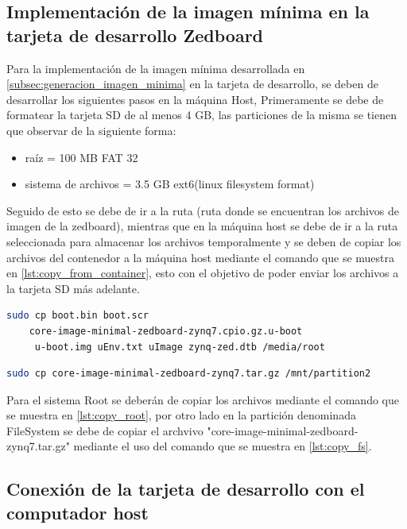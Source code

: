 \subsection{Implementación de la imagen mínima en la tarjeta de desarrollo Zedboard}

Para la implementación de la imagen mínima desarrollada en \ref{subsec:generacion_imagen_minima} en la tarjeta de desarrollo, se deben de desarrollar los siguientes pasos en la máquina Host, Primeramente se debe de formatear la tarjeta SD de al menos 4 GB, las particiones de la misma se tienen que observar de la siguiente forma:

\begin{itemize}
    \item raíz = 100 MB FAT 32
    \item sistema de archivos = 3.5 GB ext6(linux filesystem format)
\end{itemize} 

Seguido de esto se debe de ir a la ruta (ruta donde se encuentran los archivos de imagen de la zedboard), mientras que en la máquina host se debe de ir a la ruta seleccionada para almacenar los archivos temporalmente y se deben de copiar los archivos del contenedor a la máquina host mediante el comando que se muestra en \ref{lst:copy_from_container}, esto con el objetivo de poder enviar los archivos a la tarjeta SD más adelante.

\begin{lstlisting}[language=bash, caption={Copiar archivos root, Linux}, label=lst:copy_root]
    sudo cp boot.bin boot.scr 
    core-image-minimal-zedboard-zynq7.cpio.gz.u-boot
     u-boot.img uEnv.txt uImage zynq-zed.dtb /media/root
\end{lstlisting}

\begin{lstlisting}[language=bash, caption={Copiar sistema de archivos, Linux}, label=lst:copy_fs]
    sudo cp core-image-minimal-zedboard-zynq7.tar.gz /mnt/partition2
\end{lstlisting}

Para el sistema Root se deberán de copiar los archivos mediante el comando que se muestra en \ref{lst:copy_root}, por otro lado en la partición denominada FileSystem se debe de copiar el archvivo "core-image-minimal-zedboard-zynq7.tar.gz" mediante el uso del comando que se muestra en \ref{lst:copy_fs}.

\subsection{Conexión de la tarjeta de desarrollo con el computador host}


